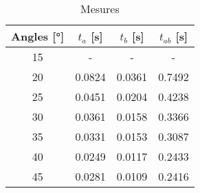 \begin{table}
\centering
\begin{tabular}{|c|c|c|c|}
\hline
Angles [°] & $t_a$ [s] & $t_b$ [s] & $t_{ab}$ [s] \\
\hline
15 & - & - & - \\
\hline
20 & 0.0824 & 0.0361 & 0.7492 \\
\hline
25 & 0.0451 & 0.0204 & 0.4238 \\
\hline
30 & 0.0361 & 0.0158 & 0.3366 \\
\hline
35 & 0.0331 & 0.0153 & 0.3087 \\
\hline
40 & 0.0249 & 0.0117 & 0.2433 \\
\hline
45 & 0.0281 & 0.0109 & 0.2416 \\
\hline
\end{tabular}
\caption{Mesures}
\label{table:mesureee}
\end{table}
